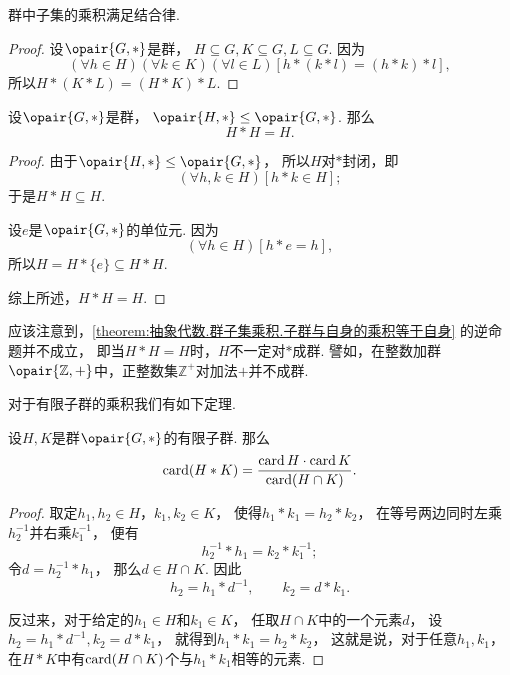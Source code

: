 \begin{proposition}\label{theorem:抽象代数.群子集乘积.群子集乘积满足结合律}
群中子集的乘积满足结合律.
\begin{proof}
设\(\opair{G,*}\)是群，
\(H \subseteq G,
K \subseteq G,
L \subseteq G\).
因为\begin{equation*}
	(\forall h \in H)
	(\forall k \in K)
	(\forall l \in L)
	[h * (k * l) = (h * k) * l],
\end{equation*}
所以\(H * (K * L) = (H * K) * L\).
\end{proof}
\end{proposition}

\begin{proposition}\label{theorem:抽象代数.群子集乘积.子群与自身的乘积等于自身}
设\(\opair{G,*}\)是群，
\(\opair{H,*} \AlgebraSubstructure \opair{G,*}\).
那么\begin{equation*}
	H * H = H.
\end{equation*}
\begin{proof}
由于\(\opair{H,*}\AlgebraSubstructure\opair{G,*}\)，
所以\(H\)对\(*\)封闭，即\begin{equation*}
	(\forall h,k \in H)
	[h * k \in H];
\end{equation*}
于是\(H * H \subseteq H\).

设\(e\)是\(\opair{G,*}\)的单位元.
因为\begin{equation*}
	(\forall h \in H)
	[h * e = h],
\end{equation*}
所以\(H = H * \{e\} \subseteq H * H\).

综上所述，\(H * H = H\).
\end{proof}
\end{proposition}

应该注意到，\cref{theorem:抽象代数.群子集乘积.子群与自身的乘积等于自身} 的逆命题并不成立，
即当\(H * H = H\)时，\(H\)不一定对\(*\)成群.
譬如，在整数加群\(\opair{\mathbb{Z},+}\)中，正整数集\(\mathbb{Z}^+\)对加法\(+\)并不成群.

对于有限子群的乘积我们有如下定理.
\begin{theorem}
设\(H,K\)是群\(\opair{G,*}\)的有限子群.
那么\begin{equation*}
	\operatorname{card}(H * K)
	= \frac{\operatorname{card} H \cdot \operatorname{card} K}{\operatorname{card}(H \cap K)}.
\end{equation*}
\begin{proof}
取定\(h_1,h_2 \in H\)，\(k_1,k_2 \in K\)，
使得\(h_1 * k_1 = h_2 * k_2\)，
在等号两边同时左乘\(h_2^{-1}\)并右乘\(k_1^{-1}\)，
便有\begin{equation*}
	h_2^{-1} * h_1 = k_2 * k_1^{-1};
\end{equation*}
令\(d = h_2^{-1} * h_1\)，
那么\(d \in H \cap K\).
因此\begin{equation*}
	h_2 = h_1 * d^{-1}, \qquad
	k_2 = d * k_1.
\end{equation*}

反过来，对于给定的\(h_1 \in H\)和\(k_1 \in K\)，
任取\(H \cap K\)中的一个元素\(d\)，
设\(h_2 = h_1 * d^{-1},
k_2 = d * k_1\)，
就得到\(h_1 * k_1 = h_2 * k_2\)，
这就是说，对于任意\(h_1,k_1\)，
在\(H * K\)中有\(\operatorname{card}(H \cap K)\)个与\(h_1 * k_1\)相等的元素.
\end{proof}
\end{theorem}

